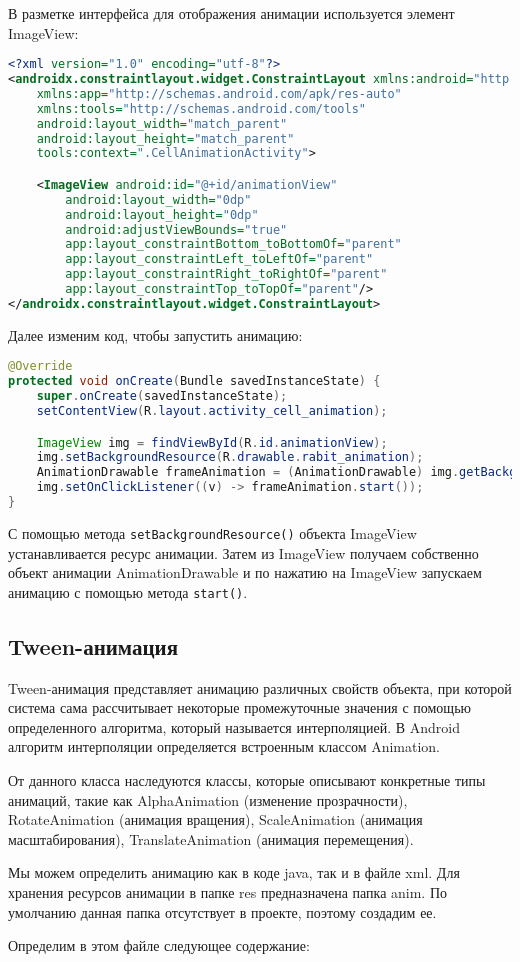 В разметке интерфейса для отображения анимации используется элемент
ImageView:

\begin{lstlisting}[language=XML
	, label=lst:
	]
<?xml version="1.0" encoding="utf-8"?>
<androidx.constraintlayout.widget.ConstraintLayout xmlns:android="http://schemas.android.com/apk/res/android"
    xmlns:app="http://schemas.android.com/apk/res-auto"
    xmlns:tools="http://schemas.android.com/tools"
    android:layout_width="match_parent"
    android:layout_height="match_parent"
    tools:context=".CellAnimationActivity">

    <ImageView android:id="@+id/animationView"
        android:layout_width="0dp"
        android:layout_height="0dp"
        android:adjustViewBounds="true"
        app:layout_constraintBottom_toBottomOf="parent"
        app:layout_constraintLeft_toLeftOf="parent"
        app:layout_constraintRight_toRightOf="parent"
        app:layout_constraintTop_toTopOf="parent"/>
</androidx.constraintlayout.widget.ConstraintLayout>
\end{lstlisting}

Далее изменим код, чтобы запустить анимацию:

\begin{lstlisting}[language=Java
	, label=lst:
	]
@Override
protected void onCreate(Bundle savedInstanceState) {
	super.onCreate(savedInstanceState);
	setContentView(R.layout.activity_cell_animation);

	ImageView img = findViewById(R.id.animationView);
	img.setBackgroundResource(R.drawable.rabit_animation);
	AnimationDrawable frameAnimation = (AnimationDrawable) img.getBackground();
	img.setOnClickListener((v) -> frameAnimation.start());
}
\end{lstlisting}

С помощью метода \texttt{setBackgroundResource()} объекта ImageView
устанавливается ресурс анимации. Затем из ImageView получаем собственно
объект анимации AnimationDrawable и по нажатию на ImageView запускаем
анимацию с помощью метода \texttt{start()}.

\subsection{Tween-анимация}
Tween-анимация представляет анимацию различных свойств объекта, при
которой система сама рассчитывает некоторые промежуточные значения с
помощью определенного алгоритма, который называется интерполяцией. В 
Android алгоритм интерполяции определяется встроенным классом
Animation.\par
От данного класса наследуются классы, которые описывают конкретные
типы анимаций, такие как AlphaAnimation (изменение прозрачности),
RotateAnimation (анимация вращения), ScaleAnimation (анимация
масштабирования), TranslateAnimation (анимация перемещения).\par
Мы можем определить анимацию как в коде java, так и в файле xml. Для
хранения ресурсов анимации в папке res предназначена папка anim. По
умолчанию данная папка отсутствует в проекте, поэтому создадим ее.\par
Определим в этом файле следующее содержание:

